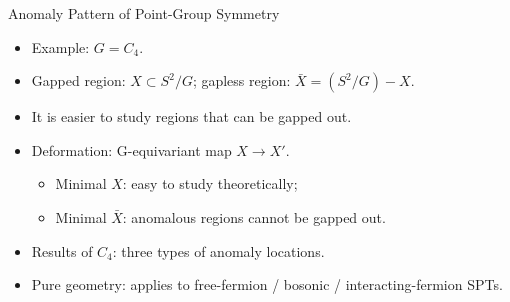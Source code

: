 \documentclass[xcolor=table, 11pt, aspectratio=169]{beamer}
\begin{document}
    \begin{frame}{Anomaly Pattern of Point-Group Symmetry}
      \begin{itemize}
        \item<1-> Example: $G=C_4$.
        \item<2-> Gapped region: $X\subset S^2/G$; gapless region: $\bar X=(S^2/G) - X$.
        \item<2-> It is easier to study regions that can be gapped out.
        \item<3-> Deformation: G-equivariant map $X\rightarrow X'$.
        \begin{itemize}
          \item<4-> Minimal $X$: easy to study theoretically;
          \item<5-> Minimal $\bar X$: anomalous regions cannot be gapped out.
        \end{itemize}
        \item<6-> Results of $C_4$: three types of anomaly locations.
        \item<7-> Pure geometry: applies to free-fermion / bosonic / interacting-fermion SPTs.
      \end{itemize}
      \begin{center}
        \hspace{2em}
        \begin{animateinline}{30}
        \end{animateinline}
        \hspace{4em}

\end{center}
\end{frame}
\end{document}
